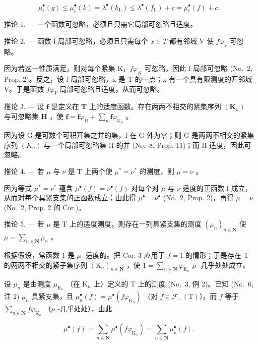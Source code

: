 \[
\mu_ {i} ^ {\bullet} (g) \leqslant \mu_ {i} ^ {\bullet} (k) = \lambda^ {\bullet} (k _ {\mathrm{L}}) \leqslant \lambda^ {\bullet} (f _ {\mathrm{L}}) + c = \mu_ {i} ^ {\bullet} (f) + c.
\]

推论 1. --- 一个函数可忽略，必须且只需它局部可忽略且适度。

推论 2. --- 函数 f 局部可忽略，必须且只需每个 \(x \in T\) 都有邻域 V 使 \(f\varphi_{V}\) 可忽略。

因为若这一性质满足，则对每个紧集 K，\(f\varphi_{K}\) 可忽略，因此 f 局部可忽略 (No.~2, Prop. 2)。反之，设 f 局部可忽略，x 是 T 的一点；x 有一个具有限测度的开邻域 V。于是函数 \(f\varphi_{V}\) 局部可忽略且适度，从而可忽略。

推论 3. --- 设 \(\mathbf{f}\) 是定义在 \(\mathbf{T}\) 上的适度函数。存在两两不相交的紧集序列 \((\mathbf{K}_n)\) 与可忽略集 \(\mathbf{H}\) ，使 \(\mathbf{f} = \mathbf{f}\varphi_{\mathrm{H}} + \sum_{n} \mathbf{f}\varphi_{\mathrm{K}_n}\) 。

因为设 G 是可数个可积开集之并的集，f 在 G 外为零；则 G 是两两不相交的紧集序列 \((K_{n})\) 与一个局部可忽略集 H 的并 (No.~8, Prop. 11)；而 H 适度，因此可忽略。

推论 4. --- 若 \(\mu\) 与 \(\nu\) 是 T 上两个使 \(\mu^{*} = \nu^{*}\) 的测度，则 \(\mu = \nu\) 。

因为等式 \(\mu^{*}=\nu^{*}\) 蕴含 \(\mu^{\bullet}(f)=\nu^{\bullet}(f)\) 对每个对 \(\mu\) 与 \(\nu\) 适度的正函数 f 成立，从而对每个具紧支集的正函数成立；由此得 \(\mu^{\bullet}=\nu^{\bullet}\) (No.~2, Prop. 2)，再得 \(\mu=\nu\) (No.~2, Prop. 2 的 Cor.)。

推论 5. --- 若 \(\mu\) 是 T 上的适度测度，则存在一列具紧支集的测度 \((\mu_n)_{n \in \mathbf{N}}\) 使 \(\mu = \sum_{n \in \mathbf{N}} \mu_n\) 。

根据假设，常函数 1 是 \(\mu\) -适度的。把 Cor. 3 应用于 \(f = 1\) 的情形；于是存在 T 的两两不相交的紧子集序列 \((\mathrm{K}_n)_{n \in \mathbf{N}}\) ，使 \(1 = \sum_{n \in \mathbf{N}} \varphi_{\mathrm{K}_n}\) \(\mu\) -几乎处处成立。

设 \(\mu_{n}\) 是由测度 \(\mu_{\mathrm{K}_n}\) （在 \(\mathrm{K}_n\) 上）定义的 T 上的测度 (No.~3, 例 2)。已知 (No.~6, 注 2) \(\mu_{n}\) 具紧支集，且 \(\mu_n^\bullet (f) = \mu^\bullet (f\varphi_{\mathrm{K}_n})\) （对 \(f\in \mathcal{F}_{+}(\mathrm{T})\)）。而 \(f\) 等于 \(\sum_{n\in \mathbf{N}}f\varphi_{\mathrm{K}_n}\) （\(\mu\) -几乎处处），由此

\[
\mu^ {\bullet} (f) = \sum_ {n \in \mathbf {N}} \mu^ {\bullet} (f \varphi_ {\mathrm{K} _ {n}}) = \sum_ {n \in \mathbf {N}} \mu_ {n} ^ {\bullet} (f).
\]

